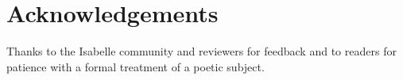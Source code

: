 \documentclass[11pt,a4paper]{article}
\begin{document}
\section{Acknowledgements}

Thanks to the Isabelle community and reviewers for feedback and to readers for
patience with a formal treatment of a poetic subject.

\bigskip



\end{document}
